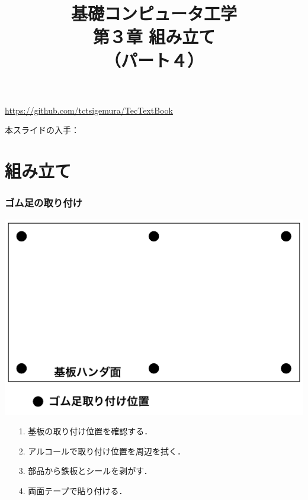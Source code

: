 \documentclass[handout]{beamer}        %
\begin{document}
\title{基礎コンピュータ工学\\第３章 組み立て\\（パート４）}
\date{}

\begin{frame}
  \titlepage
  \centerline{\url{https://github.com/tctsigemura/TecTextBook}}
  \vfill
  \centerline{本スライドの入手：
    }
\end{frame}


\section{組み立て}
\begin{frame}
  \frametitle{ゴム足の取り付け}
  \vfill
  \centerline{\includegraphics[scale=0.7]{../Tikz/asi.pdf}}
  \vfill
  \begin{enumerate}
    \item[1.] 基板の取り付け位置を確認する．
    \item[2.] アルコールで取り付け位置を周辺を拭く．
    \item[3.] 部品から鉄板とシールを剥がす．
    \item[4.] 両面テープで貼り付ける．
  \end{enumerate}
  \vfill
\end{frame}
\end{document}
